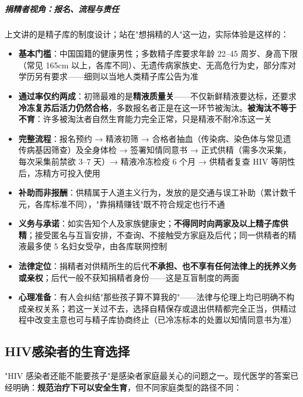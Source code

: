 \documentclass[12pt,a4paper,twoside]{ctexbook}
\begin{document}
\subparagraph{捐精者视角：报名、流程与责任}

上文讲的是精子库的制度设计；站在"想捐精的人"这一边，实际体验是这样的：

\begin{itemize}
	\item \textbf{基本门槛}：中国国籍的健康男性；多数精子库要求年龄 22--45 周岁、身高下限（常见 165cm 以上，各库不同）、无遗传病家族史、无高危行为史，部分库对学历另有要求——细则以当地人类精子库公告为准
	\item \textbf{通过率仅约两成}：初筛最难的是\textbf{精液质量关}——不仅新鲜精液要达标，还要求\textbf{冷冻复苏后活力仍然合格}，多数报名者正是在这一环节被淘汰。\textbf{被淘汰不等于不育}：许多被淘汰者自然生育能力完全正常，只是精液不耐冷冻这一关
	\item \textbf{完整流程}：报名预约 → 精液初筛 → 合格者抽血（传染病、染色体与常见遗传病基因筛查）及全身体检 → 签署知情同意书 → 正式供精（需多次采集，每次采集前禁欲 3--7 天）→ 精液冷冻检疫 6 个月 → 供精者复查 HIV 等阴性后，冻精方可投入使用
	\item \textbf{补助而非报酬}：供精属于人道主义行为，发放的是交通与误工补助（累计数千元，各库标准不同），"靠捐精赚钱"既不符合规定也行不通
	\item \textbf{义务与承诺}：如实告知个人及家族健康史；\textbf{不得同时向两家及以上精子库供精}；接受匿名与互盲安排，不查询、不接触受方家庭及后代；同一供精者的精液最多使 5 名妇女受孕，由各库联网控制
	\item \textbf{法律定位}：捐精者对供精所生的后代\textbf{不承担、也不享有任何法律上的抚养义务或亲权}；后代一般不获知捐精者身份——这是互盲制度的两面
	\item \textbf{心理准备}：有人会纠结"那些孩子算不算我的"——法律与伦理上均已明确不构成亲权关系；若这一关过不去，选择自精保存或退出供精都完全正当，供精过程中改变主意也可与精子库协商终止（已冷冻标本的处置以知情同意书为准）
\end{itemize}

\subsection{HIV感染者的生育选择}

"HIV 感染者还能不能要孩子"是感染者家庭最关心的问题之一。现代医学的答案已经明确：\textbf{规范治疗下可以安全生育}，但不同家庭类型的路径不同：
\end{document}
